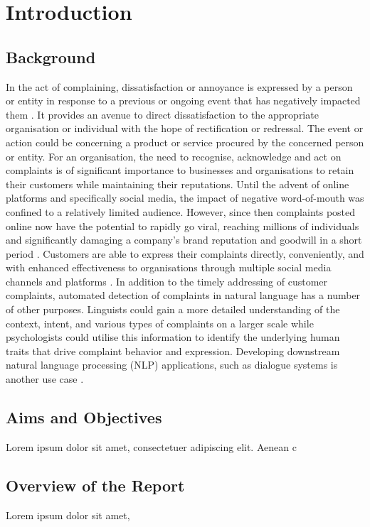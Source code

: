 \chapter{Introduction}

\section{Background}

In the act of complaining, dissatisfaction or annoyance is expressed by a person or entity in response to a previous or ongoing event that has negatively impacted them \cite{olshtain_speechact_1987}. It provides an avenue to direct dissatisfaction to the appropriate organisation or individual with the hope of rectification or redressal. The event or action could be concerning a product or service procured by the concerned person or entity. For an organisation, the need to recognise, acknowledge and act on complaints is of significant importance to businesses and organisations to retain their customers while maintaining their reputations.
\newline \newline
Until the advent of online platforms and specifically social media, the impact of negative word-of-mouth was confined to a relatively limited audience. However, since then complaints posted online now have the potential to rapidly go viral, reaching millions of individuals and significantly damaging a company's brand reputation and goodwill in a short period \cite{tripp_when_2011}. Customers are able to express their complaints directly, conveniently, and with enhanced effectiveness to organisations through multiple social media channels and platforms \cite{balaji_customer_2015}.
\newline \newline
In addition to the timely addressing of customer complaints, automated detection of complaints in natural language has a number of other purposes. Linguists could gain a more detailed understanding of the context, intent, and various types of complaints on a larger scale while psychologists could utilise this information to identify the underlying human traits that drive complaint behavior and expression. Developing downstream natural language processing (NLP) applications, such as dialogue systems is another use case \cite{preotiuc-pietro_automatically_2019}.



\section{Aims and Objectives}

Lorem ipsum dolor sit amet, consectetuer adipiscing elit. Aenean c

\section{Overview of the Report}

Lorem ipsum dolor sit amet, 
